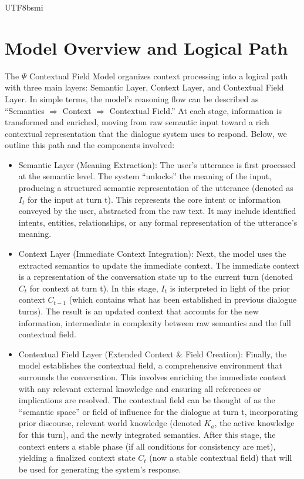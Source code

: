 \documentclass{article}
\begin{document}
\begin{CJK*}{UTF8}{bsmi}
\section{Model Overview and Logical Path}
The $\Psi$ Contextual Field Model organizes context processing into a logical path with three main layers: Semantic Layer, Context Layer, and Contextual Field Layer. In simple terms, the model’s reasoning flow can be described as “Semantics $\Rightarrow$ Context $\Rightarrow$ Contextual Field.” At each stage, information is transformed and enriched, moving from raw semantic input toward a rich contextual representation that the dialogue system uses to respond. Below, we outline this path and the components involved:
\begin{itemize}[label=●]
    \item Semantic Layer (Meaning Extraction): The user’s utterance is first processed at the semantic level. The system “unlocks” the meaning of the input, producing a structured semantic representation of the utterance (denoted as $I_t$ for the input at turn t). This represents the core intent or information conveyed by the user, abstracted from the raw text. It may include identified intents, entities, relationships, or any formal representation of the utterance’s meaning.
    \item Context Layer (Immediate Context Integration): Next, the model uses the extracted semantics to update the immediate context. The immediate context is a representation of the conversation state up to the current turn (denoted $C_t$ for context at turn t). In this stage, $I_t$ is interpreted in light of the prior context $C_{t-1}$ (which contains what has been established in previous dialogue turns). The result is an updated context that accounts for the new information, intermediate in complexity between raw semantics and the full contextual field.
    \item Contextual Field Layer (Extended Context \& Field Creation): Finally, the model establishes the contextual field, a comprehensive environment that surrounds the conversation. This involves enriching the immediate context with any relevant external knowledge and ensuring all references or implications are resolved. The contextual field can be thought of as the “semantic space” or field of influence for the dialogue at turn t, incorporating prior discourse, relevant world knowledge (denoted $K_a$, the active knowledge for this turn), and the newly integrated semantics. After this stage, the context enters a stable phase (if all conditions for consistency are met), yielding a finalized context state $C_t$ (now a stable contextual field) that will be used for generating the system’s response.
\end{itemize}


\end{CJK*}
\end{document}
